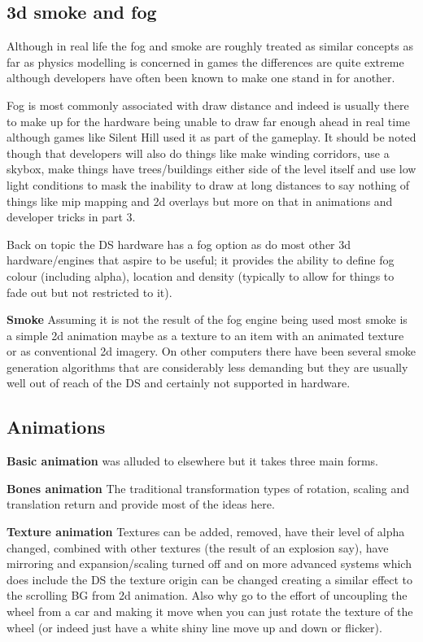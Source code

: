 \documentclass[
]{book}
\begin{document}
\hypertarget{d-smoke-and-fog}{%
\subsection{3d smoke and fog}\label{d-smoke-and-fog}}

Although in real life the fog and smoke are roughly treated as similar concepts as far as physics modelling is concerned in games the differences are quite extreme although developers have often been known to make one stand in for another.

Fog is most commonly associated with draw distance and indeed is usually there to make up for the hardware being unable to draw far enough ahead in real time although games like Silent Hill used it as part of the gameplay. It should be noted though that developers will also do things like make winding corridors, use a skybox, make things have trees/buildings either side of the level itself and use low light conditions to mask the inability to draw at long distances to say nothing of things like mip mapping and 2d overlays but more on that in animations and developer tricks in part 3.

Back on topic the DS hardware has a fog option as do most other 3d hardware/engines that aspire to be useful; it provides the ability to define fog colour (including alpha), location and density (typically to allow for things to fade out but not restricted to it).

\textbf{Smoke} Assuming it is not the result of the fog engine being used most smoke is a simple 2d animation maybe as a texture to an item with an animated texture or as conventional 2d imagery. On other computers there have been several smoke generation algorithms that are considerably less demanding but they are usually well out of reach of the DS and certainly not supported in hardware.

\hypertarget{animations}{%
\subsection{Animations}\label{animations}}

\textbf{Basic animation} was alluded to elsewhere but it takes three main forms.

\textbf{Bones animation} The traditional transformation types of rotation, scaling and translation return and provide most of the ideas here.

\textbf{Texture animation} Textures can be added, removed, have their level of alpha changed, combined with other textures (the result of an explosion say), have mirroring and expansion/scaling turned off and on more advanced systems which does include the DS the texture origin can be changed creating a similar effect to the scrolling BG from 2d animation. Also why go to the effort of uncoupling the wheel from a car and making it move when you can just rotate the texture of the wheel (or indeed just have a white shiny line move up and down or flicker).
\end{document}
